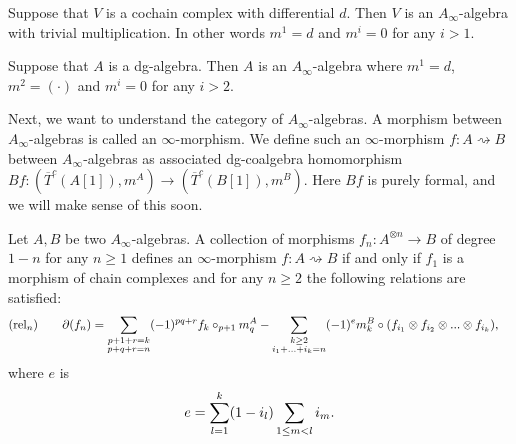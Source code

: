 \documentclass[../thesis.tex]{subfiles}
\begin{document}
        \begin{example}
            Suppose that $V$ is a cochain complex with differential $d$. Then $V$ is an $A_\infty$-algebra with trivial multiplication. In other words $m^1 = d$ and $m^i = 0$ for any $i>1$.
        \end{example}

        \begin{example}
            Suppose that $A$ is a dg-algebra. Then $A$ is an $A_\infty$-algebra where $m^1 = d$, $m^2 = (\cdot)$ and $m^i=0$ for any $i>2$.
        \end{example}


        Next, we want to understand the category of $A_\infty$-algebras. A morphism between $A_\infty$-algebras is called an $\infty$-morphism. We define such an $\infty$-morphism $f:A\rightsquigarrow B$ between $A_\infty$-algebras as associated dg-coalgebra homomorphism $Bf:(\overline{T}^c(A[1]), m^A)\rightarrow (\overline{T}^c(B[1]), m^B)$. Here $Bf$ is purely formal, and we will make sense of this soon.

        \begin{proposition}
            Let $A,B$ be two $A_\infty$-algebras. A collection of morphisms $f_n : A^{\otimes n} \rightarrow B$ of degree $1-n$ for any $n \geq 1$ defines an $\infty$-morphism $f : A \rightsquigarrow B$ if and only if $f_1$ is a morphism of chain complexes and for any $n\geq 2$ the following relations are satisfied:
            \begin{align*}
                & (\text{rel}_n)\qquad \partial(f_n) = \sum_{\substack{p + 1 + r = k \\ p + q + r = n}}(-1)^{pq+r}f_k\circ_{p+1}m^A_q - \sum_{\substack{k\geq 2 \\ i_1 + ... + i_k = n}}(-1)^{e}m^B_k \circ (f_{i_1}\otimes f_{i_2}\otimes ... \otimes f_{i_k})\tt{,}
            \end{align*}
            where $e$ is
            \begin{align*}
                e = \sum_{l = 1}^k(1-i_l)\sum_{1\leq m < l}i_m\tt{.}
            \end{align*}
        \end{proposition}
        
\end{document}
